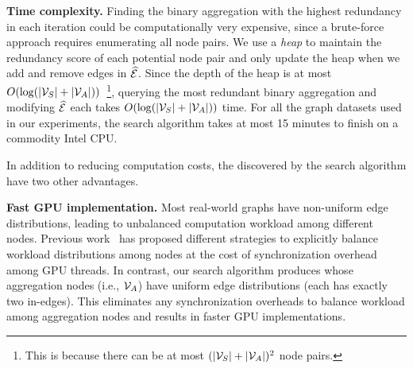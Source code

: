 {\bf Time complexity.} Finding the binary aggregation with the highest redundancy in each iteration could be computationally very expensive, since a brute-force approach requires enumerating all node pairs.
We use a {\em heap} to maintain the redundancy score of each potential node pair and only update the heap when we add and remove edges in $\mathcal{\widehat{E}}$.
Since the depth of the heap is at most $O(\log(|\mathcal{V}_S| + |\mathcal{V}_A|))$~\footnote{This is because there can be at most $(|\mathcal{V}_S| + |\mathcal{V}_A|)^2$ node pairs.}, querying the most redundant binary aggregation and modifying $\mathcal{\widehat{E}}$ each takes $O(\log(|\mathcal{V}_S| + |\mathcal{V}_A|))$ time. 
For all the graph datasets used in our experiments, the \xg search algorithm takes at most 15 minutes to finish on a commodity Intel CPU.

In addition to reducing computation costs, the \xgs discovered by the \xg search algorithm have two other advantages.

{\bf Fast GPU implementation.} Most real-world graphs have non-uniform edge distributions, leading to unbalanced computation workload among different nodes.
Previous work~\cite{NGra, Lux} has proposed different strategies to explicitly balance workload distributions among nodes at the cost of synchronization overhead among GPU threads.
In contrast, our \xg search algorithm produces \xgs whose aggregation nodes (i.e., $\mathcal{V}_A$) have uniform edge distributions (each has exactly two in-edges).
This eliminates any synchronization overheads to balance workload among aggregation nodes and results in faster GPU implementations.

